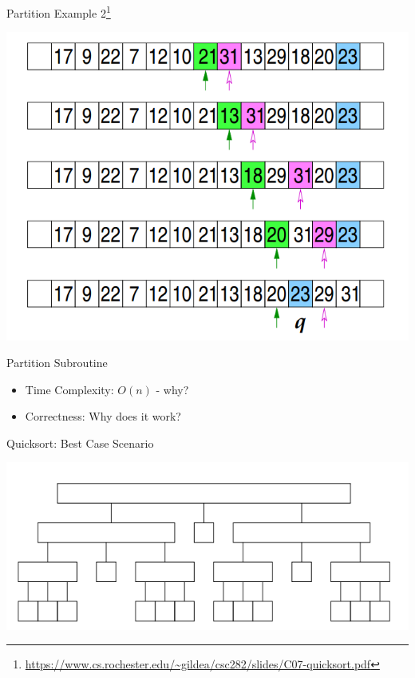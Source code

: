 \documentclass{beamer}
\begin{document}
\begin{frame}{Partition Example 2\footnote{\url{https://www.cs.rochester.edu/~gildea/csc282/slides/C07-quicksort.pdf}}}
\begin{center}
    \includegraphics[scale=0.36]{partitionExample3.png}
\end{center}
\end{frame}



\begin{frame}{Partition Subroutine}
\begin{itemize}
\item Time Complexity: $O(n)$ - why?
\item Correctness: Why does it work?
\end{itemize}
\end{frame}


\begin{frame}{Quicksort: Best Case Scenario}
\begin{center}
    \includegraphics[scale=0.4]{quickSortBestCase.png}
\end{center}
\end{frame}
\end{document}

